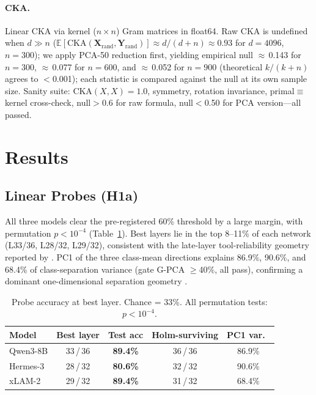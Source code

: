 \documentclass{article}
\begin{document}
\paragraph{CKA.}
Linear CKA \citep{kornblith2019similarity} via kernel ($n{\times}n$)
Gram matrices in float64.  Raw CKA is undefined when $d{\gg}n$
($\mathbb{E}[\text{CKA}(\mathbf{X}_\text{rand},\mathbf{Y}_\text{rand})]
\approx d/(d+n) \approx 0.93$ for $d{=}4096$, $n{=}300$); we apply
PCA-50 reduction first, yielding empirical null $\approx$\,0.143 for
$n{=}300$, $\approx$\,0.077 for $n{=}600$, and $\approx$\,0.052 for
$n{=}900$ (theoretical $k/(k+n)$ agrees to $<$0.001); each statistic
is compared against the null at its own sample size.  Sanity suite: $\text{CKA}(X,X){=}1.0$,
symmetry, rotation invariance, primal$\equiv$kernel cross-check,
null$>$0.6 for raw formula, null$<$0.50 for PCA version---all passed.

\section{Results}
\label{sec:results}

\subsection{Linear Probes (H1a)}

All three models clear the pre-registered 60\% threshold by a large
margin, with permutation $p<10^{-4}$ (Table~\ref{tab:probe}).
Best layers lie in the top 8--11\% of each network (L33/36, L28/32,
L29/32), consistent with the late-layer tool-reliability geometry
reported by \citet{yin2025reasoning}.
PC1 of the three class-mean directions explains 86.9\%, 90.6\%, and
68.4\% of class-separation variance (gate G-PCA $\geq$40\%, all pass),
confirming a dominant one-dimensional separation geometry
\citep{todd2024function}.

\begin{table}[t]
\caption{Probe accuracy at best layer.  Chance = 33\%.
All permutation tests: $p<10^{-4}$.}
\label{tab:probe}
\centering\small
\begin{tabular}{lcccc}
\toprule
Model & Best layer & Test acc & Holm-surviving & PC1 var.\ \\
\midrule
Qwen3-8B   & 33\,/\,36 & \textbf{89.4\%} & 36\,/\,36 & 86.9\% \\
Hermes-3   & 28\,/\,32 & \textbf{80.6\%} & 32\,/\,32 & 90.6\% \\
xLAM-2     & 29\,/\,32 & \textbf{89.4\%} & 31\,/\,32 & 68.4\% \\
\bottomrule
\end{tabular}
\end{table}
\end{document}
